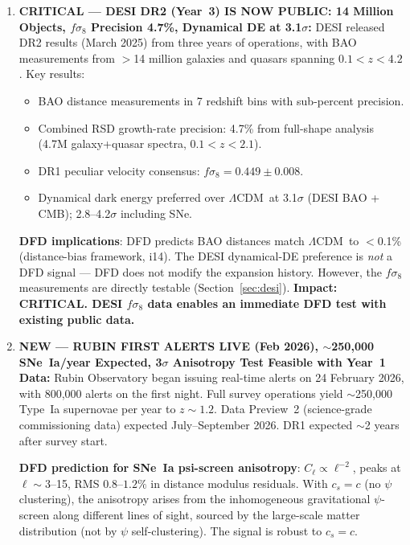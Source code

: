 \documentclass[11pt,a4paper]{article}
\newcommand{\LCDM}{$\Lambda$CDM}
\begin{document}
\begin{findbox}
\begin{enumerate}
  \textbf{Impact: CRITICAL. The tomographic $S_8$ gradient test SURVIVES
  but its amplitude requires mochi\_class for precise calibration.
  The weekend-viable analysis pipeline from i17 remains valid as a
  discovery tool, but the predicted $\Delta S_8$ amplitude now has
  larger theoretical uncertainty: $\Delta S_8 = 0.05$--$0.10$ (was
  $0.07 \pm 0.02$).}

\item \textbf{CRITICAL --- DESI DR2 (Year~3) IS NOW PUBLIC: 14 Million
  Objects, $f\sigma_8$ Precision 4.7\%, Dynamical DE at 3.1$\sigma$:}
  DESI released DR2 results (March 2025) from three years of operations,
  with BAO measurements from $>$14 million galaxies and quasars spanning
  $0.1 < z < 4.2$. Key results:
  \begin{itemize}[nosep]
  \item BAO distance measurements in 7 redshift bins with sub-percent
    precision.
  \item Combined RSD growth-rate precision: 4.7\% from full-shape
    analysis (4.7M galaxy+quasar spectra, $0.1 < z < 2.1$).
  \item DR1 peculiar velocity consensus: $f\sigma_8 = 0.449 \pm 0.008$.
  \item Dynamical dark energy preferred over \LCDM\ at 3.1$\sigma$
    (DESI BAO + CMB); 2.8--4.2$\sigma$ including SNe.
  \end{itemize}
  \textbf{DFD implications}: DFD predicts BAO distances match \LCDM\
  to $<$0.1\% (distance-bias framework, i14). The DESI dynamical-DE
  preference is \emph{not} a DFD signal --- DFD does not modify the
  expansion history. However, the $f\sigma_8$ measurements are directly
  testable (Section~\ref{sec:desi}).
  \textbf{Impact: CRITICAL. DESI $f\sigma_8$ data enables an immediate
  DFD test with existing public data.}

\item \textbf{NEW --- RUBIN FIRST ALERTS LIVE (Feb 2026), $\sim$250,000
  SNe~Ia/year Expected, 3$\sigma$ Anisotropy Test Feasible with
  Year~1 Data:}
  Rubin Observatory began issuing real-time alerts on 24 February 2026,
  with 800,000 alerts on the first night. Full survey operations yield
  $\sim$250,000 Type~Ia supernovae per year to $z \sim 1.2$.
  Data Preview~2 (science-grade commissioning data) expected July--September
  2026. DR1 expected $\sim$2 years after survey start.

  \textbf{DFD prediction for SNe~Ia psi-screen anisotropy}:
  $C_\ell \propto \ell^{-2}$, peaks at $\ell \sim 3$--15, RMS
  $0.8$--$1.2\%$ in distance modulus residuals. With $c_s = c$ (no
  $\psi$ clustering), the anisotropy arises from the inhomogeneous
  gravitational $\psi$-screen along different lines of sight, sourced
  by the large-scale matter distribution (not by $\psi$ self-clustering).
  The signal is robust to $c_s = c$.


\end{enumerate}
\end{findbox}
\end{document}
